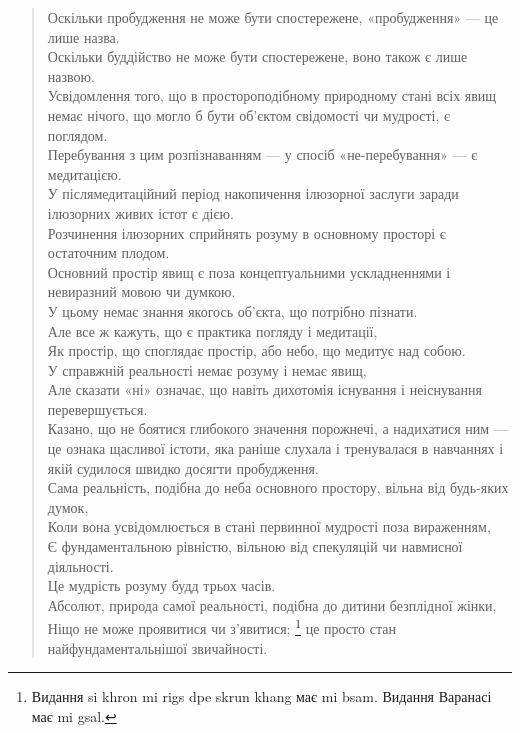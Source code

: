 \documentclass{article}
\begin{document}
\begin{verse}
        Оскільки пробудження не може бути спостережене, «пробудження» — це лише назва. \\
        Оскільки буддійство не може бути спостережене, воно також є лише назвою. \\
        Усвідомлення того, що в простороподібному природному стані всіх явищ немає нічого, що могло б бути об’єктом свідомості чи мудрості, є поглядом. \\
        Перебування з цим розпізнаванням — у спосіб «не-перебування» — є медитацією. \\
        У післямедитаційний період накопичення ілюзорної заслуги заради ілюзорних живих істот є дією. \\
        Розчинення ілюзорних сприйнять розуму в основному просторі є остаточним плодом. \\
        Основний простір явищ є поза концептуальними ускладненнями і невиразний мовою чи думкою. \\
        У цьому немає знання якогось об’єкта, що потрібно пізнати. \\
        Але все ж кажуть, що є практика погляду і медитації, \\
        Як простір, що споглядає простір, або небо, що медитує над собою. \\
        У справжній реальності немає розуму і немає явищ, \\
        Але сказати «ні» означає, що навіть дихотомія існування і неіснування перевершується. \\
        Казано, що не боятися глибокого значення порожнечі, а надихатися ним — це ознака щасливої істоти, яка раніше слухала і тренувалася в навчаннях і якій судилося швидко досягти пробудження. \\
        Сама реальність, подібна до неба основного простору, вільна від будь-яких думок, \\
        Коли вона усвідомлюється в стані первинної мудрості поза вираженням, \\
        Є фундаментальною рівністю, вільною від спекуляцій чи навмисної діяльності. \\
        Це мудрість розуму будд трьох часів. \\
        Абсолют, природа самої реальності, подібна до дитини безплідної жінки, \\
        Ніщо не може проявитися чи з’явитися; \footnote{Видання si khron mi rigs dpe skrun khang має mi bsam. Видання Варанасі має mi gsal.} це просто стан найфундаментальнішої звичайності. \\

\end{verse}
\end{document}
